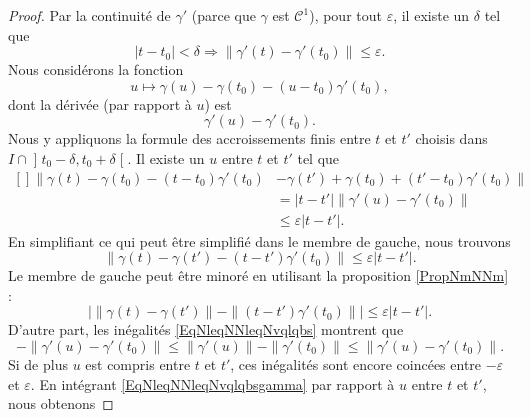 \begin{proof}
    Par la continuité de $\gamma'$ (parce que $\gamma$ est $\mathcal{C}^1$), pour tout $\varepsilon$, il existe un $\delta$ tel que 
    \begin{equation}
        | t-t_0 |<\delta\Rightarrow\big\| \gamma'(t)-\gamma'(t_0) \big\|\leq \varepsilon.
    \end{equation}
    Nous considérons la fonction 
    \begin{equation}
        u\mapsto \gamma(u)-\gamma(t_0)-(u-t_0)\gamma'(t_0),
    \end{equation}
    dont la dérivée (par rapport à $u$) est
    \begin{equation}
        \gamma'(u)-\gamma'(t_0).
    \end{equation}
    Nous y appliquons la formule des accroissements finis entre $t$ et $t'$ choisis dans $I\cap\mathopen] t_0-\delta , t_0+\delta \mathclose[$. Il existe un $u$ entre $t$ et $t'$ tel que
    \begin{equation}
        \begin{aligned}[]
            \big\| \gamma(t)-\gamma(t_0)-(t-t_0)\gamma'(t_0)&-\gamma(t')+\gamma(t_0)+(t'-t_0)\gamma'(t_0) \big\|\\
                    &=| t-t' | \|\gamma'(u)-\gamma'(t_0) \|\\
                    &\leq\varepsilon| t-t' |.
        \end{aligned}
    \end{equation}
    En simplifiant ce qui peut être simplifié dans le membre de gauche, nous trouvons
    \begin{equation}
        \big\| \gamma(t)-\gamma(t')-(t-t')\gamma'(t_0) \big\|\leq\varepsilon| t-t' |.
    \end{equation}
    Le membre de gauche peut être minoré en utilisant la proposition \ref{PropNmNNm} :
    \begin{equation}        \label{Eq0308ffttttftt}
        \Big| \| \gamma(t)-\gamma(t')\| -\|(t-t')\gamma'(t_0) \| \Big|\leq\varepsilon| t-t' |.
    \end{equation}
    D'autre part, les inégalités \eqref{EqNleqNNleqNvqlqbs} montrent que
    \begin{equation} \label{EqNleqNNleqNvqlqbsgamma}
        -\| \gamma'(u)-\gamma'(t_0) \|\leq \| \gamma'(u) \|-\| \gamma'(t_0) \|\leq\| \gamma'(u)-\gamma'(t_0) \|.
    \end{equation}
    Si de plus $u$ est compris entre $t$ et $t'$, ces inégalités sont encore coincées entre $-\varepsilon$ et $\varepsilon$. En intégrant \eqref{EqNleqNNleqNvqlqbsgamma} par rapport à $u$ entre $t$ et $t'$, nous obtenons

\end{proof}
